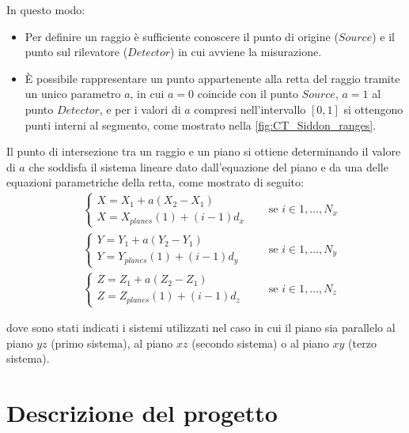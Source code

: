 \documentclass[12pt,a4paper]{report}
\begin{document}
In questo modo:
\begin{itemize}
  \item Per definire un raggio è sufficiente conoscere il punto di origine (\(Source\)) e il punto sul rilevatore (\(Detector\))
        in cui avviene la misurazione.
  \item È possibile rappresentare un punto appartenente alla retta del raggio tramite un unico parametro \(a\), in cui
        \(a = 0\) coincide con il punto \(Source\), \(a = 1\) al punto \(Detector\), e per i valori di \(a\) compresi
        nell'intervallo \([0, 1]\) si ottengono punti interni al segmento, come mostrato nella \autoref{fig:CT_Siddon_ranges}.
\end{itemize}

Il punto di intersezione tra un raggio e un piano si ottiene determinando il valore di \(a\) che soddisfa il sistema lineare dato
dall'equazione del piano e da una delle equazioni parametriche della retta, come mostrato di seguito:
\begin{equation}
  \begin{aligned}
    &\begin{cases}
      X = X_1 + a (X_2 - X_1) \\
      X = X_{planes}(1) + (i - 1) d_x
    \end{cases} \quad &\text{se } i \in 1, \dots, N_x \\
    &\begin{cases}
      Y = Y_1 + a (Y_2 - Y_1) \\
      Y = Y_{planes}(1) + (i - 1) d_y
    \end{cases} \quad &\text{se } i \in 1, \dots, N_y \\
    &\begin{cases}
      Z = Z_1 + a (Z_2 - Z_1) \\
      Z = Z_{planes}(1) + (i - 1) d_z
    \end{cases} \quad &\text{se } i \in 1, \dots, N_z
  \end{aligned} \nonumber
\end{equation}

dove sono stati indicati i sistemi utilizzati nel caso in cui il piano sia parallelo al piano \(yz\) (primo sistema), al piano
\(xz\) (secondo sistema) o al piano \(xy\) (terzo sistema).

\chapter{Descrizione del progetto} \label{chap:proj}
\end{document}
